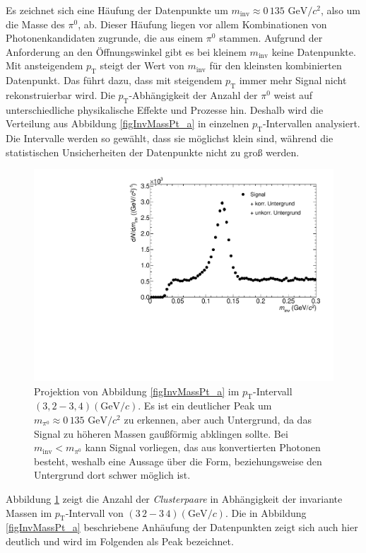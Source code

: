 Es zeichnet sich eine Häufung der Datenpunkte um $m_{\text{inv}}\approx 0\,135\text{ GeV}/c^{2}$, also um die Masse des $\pi^{0}$, ab.
Dieser Häufung liegen vor allem Kombinationen von Photonenkandidaten zugrunde, die aus einem $\pi^{0}$ stammen.
Aufgrund der Anforderung an den Öffnungswinkel gibt es bei kleinem $m_{\text{inv}}$ keine Datenpunkte.
Mit ansteigendem $p_{\text{T}}$ steigt der Wert von $m_{\text{inv}}$ für den kleinsten kombinierten Datenpunkt.
Das führt dazu, dass mit steigendem $p_{\text{T}}$ immer mehr Signal nicht rekonstruierbar wird.
\newline
Die $p_{\text{T}}$-Abhängigkeit der Anzahl der $\pi^{0}$ weist auf unterschiedliche physikalische Effekte und Prozesse hin.
Deshalb wird die Verteilung aus Abbildung \ref{figInvMassPt_a} in einzelnen $p_{\text{T}}$-Intervallen analysiert.
Die Intervalle werden so gewählt, dass sie möglichst klein sind, während die statistischen Unsicherheiten der Datenpunkte nicht zu groß werden.
\begin{figure}[tbp]
\centering
\includegraphics[width=.75\linewidth]{hSignalPlusBkg.pdf}
\caption{Projektion von Abbildung \ref{figInvMassPt_a} im $p_{\text{T}}$-Intervall $(3,2 - 3,4) (\text{GeV/}c)$. Es ist ein deutlicher Peak um $m_{\pi^{0}} \approx 0\,135\text{ GeV/}c^{2}$ zu erkennen, aber auch Untergrund, da das Signal zu höheren Massen gaußförmig abklingen sollte. Bei $m_{\text{inv}} < m_{\pi^{0}}$ kann Signal vorliegen, das aus konvertierten Photonen besteht, weshalb eine Aussage über die Form, beziehungsweise den Untergrund dort schwer möglich ist.}
\label{figSignalPlusBkg}
\end{figure}
\newline
Abbildung \ref{figSignalPlusBkg} zeigt die Anzahl der \textit{Clusterpaare} in Abhängigkeit der invariante Massen im $p_{\text{T}}$-Intervall von $(3\,2 - 3\,4)(\text{GeV}/c)$.
Die in Abbildung \ref{figInvMassPt_a} beschriebene Anhäufung der Datenpunkten zeigt sich auch hier deutlich und wird im Folgenden als Peak bezeichnet.
